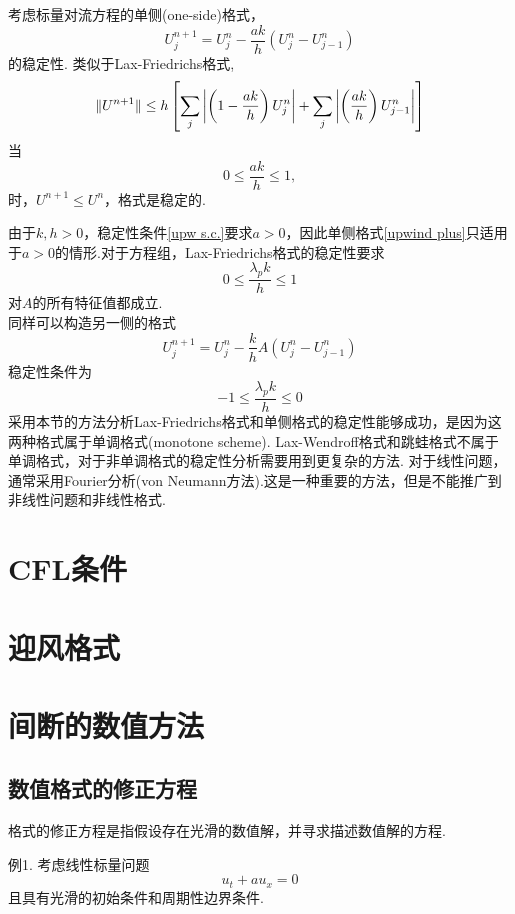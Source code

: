 \begin{myexample}
	考虑标量对流方程的单侧(one-side)格式，
	\begin{equation} \label{upwind plus}
		U_j^{n+1} = U_j^n - \frac{ak}{h}(U_j^n - U_{j-1}^n)
	\end{equation}
	的稳定性.
	类似于Lax-Friedrichs格式,
	\begin{equation}
		\lVert U^{n+1}\rVert \le h \left[ \sum_j    \left| \left( 1-\frac{ak}{h}\right)U_j^n \right|  + \sum_j \left| \left( \frac{ak}{h}\right)U_{j-1}^n \right|  \right]
	\end{equation}
	当
	\begin{equation}\label{upw s.c.}
		0 \le \frac{ak}{h} \le 1,
	\end{equation}
	时，$U^{n+1}\le U^n$，格式是稳定的.
\end{myexample}
由于$k,h >0$，稳定性条件\eqref{upw s.c.}要求$a>0$，因此单侧格式\eqref{upwind plus}只适用于$a>0$的情形.对于方程组，Lax-Friedrichs格式的稳定性要求
	\begin{equation}
    	 0 \le \frac{\lambda_p k}{h}   \le 1
	\end{equation}
对$A$的所有特征值都成立.\\
同样可以构造另一侧的格式
	\begin{equation} 
		U_j^{n+1} = U_j^n - \frac{k}{h}A(U_j^n - U_{j-1}^n)
	\end{equation}
稳定性条件为
	\begin{equation}
	-1 \le \frac{\lambda_p k}{h}   \le 0
	\end{equation}
	采用本节的方法分析Lax-Friedrichs格式和单侧格式的稳定性能够成功，是因为这两种格式属于单调格式(monotone scheme). Lax-Wendroff格式和跳蛙格式不属于单调格式，对于非单调格式的稳定性分析需要用到更复杂的方法. 对于线性问题，通常采用Fourier分析(von Neumann方法).这是一种重要的方法，但是不能推广到非线性问题和非线性格式.
	
\section{CFL条件}

\section{迎风格式}

\section{间断的数值方法}
\subsection{数值格式的修正方程}
	格式的修正方程是指假设存在光滑的数值解，并寻求描述数值解的方程.

例1. 考虑线性标量问题 \nocite{Leveque92}
	\begin{equation*}
		u_t + a u_x = 0
	\end{equation*}
	且具有光滑的初始条件和周期性边界条件.